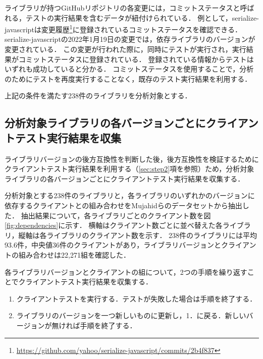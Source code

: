 \documentclass[submit]{ipsj}
\begin{document}
ライブラリが持つGitHubリポジトリの各変更には，コミットステータスと呼ばれる，テストの実行結果を含むデータが紐付けられている．
例として，serialize-javascriptは変更履歴\footnote{\url{https://github.com/yahoo/serialize-javascript/commits/2b4f837}}に登録されているコミットステータスを確認できる．%
serialize-javascriptの2022年1月19日の変更では，依存ライブラリのバージョンが変更されている．
この変更が行われた際に，同時にテストが実行され，実行結果がコミットステータスに登録されている．
登録されている情報からテストはいずれも成功していると分かる．
コミットステータスを使用することで，分析のためにテストを再度実行することなく，既存のテスト実行結果を利用する．


上記の条件を満たす238件のライブラリを分析対象とする．

\subsection{分析対象ライブラリの各バージョンごとにクライアントテスト実行結果を収集}
\label{sec:experiment}
ライブラリバージョンの後方互換性を判断した後，後方互換性を検証するためにクライアントテスト実行結果を利用する（\ref{sec:step2}項を参照）ため，分析対象ライブラリの各バージョンごとにクライアントテスト実行結果を収集する．

分析対象とする238件のライブラリと，各ライブラリのいずれかのバージョンに依存するクライアントとの組み合わせをMujahidらのデータセットから抽出した．
抽出結果について，各ライブラリごとのクライアント数を図\ref{fig:dependencies}に示す．
横軸はクライアント数ごとに並べ替えた各ライブラリ，縦軸は各ライブラリのクライアント数を示す．
238件のライブラリには平均93.6件，中央値36件のクライアントがあり，ライブラリバージョンとクライアントの組み合わせは22,271組を確認した．

各ライブラリバージョンとクライアントの組について，2つの手順を繰り返すことでクライアントテスト実行結果を収集する．

\begin{enumerate}
  \item クライアントテストを実行する．テストが失敗した場合は手順を終了する．
  \item ライブラリのバージョンを一つ新しいものに更新し，1．に戻る．新しいバージョンが無ければ手順を終了する．
\end{enumerate}
\end{document}
